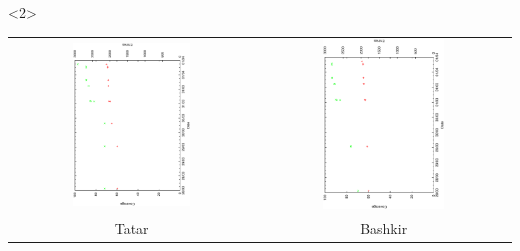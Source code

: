 \documentclass[10pt,xetex]{beamer} %
\begin{document}
\begin{frame}[fragile]
\begin{onlyenv}<2>
\begin{center}
\begin{tabular}{cc}
\includegraphics[angle=270,width=0.5\textwidth]{hist-tt-mar.ps} &  \includegraphics[angle=270,width=0.5\textwidth]{hist-ba-mar.ps} \\
Tatar & Bashkir \\
\end{tabular}
\end{center}
\end{onlyenv}


\end{frame}
\end{document}
